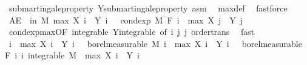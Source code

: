 \begin{isabellebody}
\ submartingale{\isacharunderscore}{\kern0pt}property\ Y{\isachardot}{\kern0pt}submartingale{\isacharunderscore}{\kern0pt}property\ asm\ \isamarkupfalse%
\ max{\isacharunderscore}{\kern0pt}def\ \isamarkupfalse%
\ fastforce\isanewline
\ \ \ \ \isamarkupfalse%
\ {\isachardoublequoteopen}AE\ {\isasymxi}\ in\ M{\isachardot}{\kern0pt}\ max\ {\isacharparenleft}{\kern0pt}X\ i\ {\isasymxi}{\isacharparenright}{\kern0pt}\ {\isacharparenleft}{\kern0pt}Y\ i\ {\isasymxi}{\isacharparenright}{\kern0pt}\ {\isasymle}\ cond{\isacharunderscore}{\kern0pt}exp\ M\ {\isacharparenleft}{\kern0pt}F\ i{\isacharparenright}{\kern0pt}\ {\isacharparenleft}{\kern0pt}{\isasymlambda}{\isasymxi}{\isachardot}{\kern0pt}\ max\ {\isacharparenleft}{\kern0pt}X\ j\ {\isasymxi}{\isacharparenright}{\kern0pt}\ {\isacharparenleft}{\kern0pt}Y\ j\ {\isasymxi}{\isacharparenright}{\kern0pt}{\isacharparenright}{\kern0pt}\ {\isasymxi}{\isachardoublequoteclose}\ \isamarkupfalse%
\ cond{\isacharunderscore}{\kern0pt}exp{\isacharunderscore}{\kern0pt}max{\isacharbrackleft}{\kern0pt}OF\ integrable\ Y{\isachardot}{\kern0pt}integrable{\isacharcomma}{\kern0pt}\ of\ i\ j\ j{\isacharbrackright}{\kern0pt}\ order{\isachardot}{\kern0pt}trans\ \isamarkupfalse%
\ fast\isanewline
\ \ \isacommand{{\isacharbraceright}{\kern0pt}}\isamarkupfalse%
\isanewline
\ \ \isamarkupfalse%
\ {\isachardoublequoteopen}{\isasymAnd}i{\isachardot}{\kern0pt}\ {\isacharparenleft}{\kern0pt}{\isasymlambda}{\isasymxi}{\isachardot}{\kern0pt}\ max\ {\isacharparenleft}{\kern0pt}X\ i\ {\isasymxi}{\isacharparenright}{\kern0pt}\ {\isacharparenleft}{\kern0pt}Y\ i\ {\isasymxi}{\isacharparenright}{\kern0pt}{\isacharparenright}{\kern0pt}\ {\isasymin}\ borel{\isacharunderscore}{\kern0pt}measurable\ M{\isachardoublequoteclose}\ {\isachardoublequoteopen}{\isasymAnd}i{\isachardot}{\kern0pt}\ {\isacharparenleft}{\kern0pt}{\isasymlambda}{\isasymxi}{\isachardot}{\kern0pt}\ max\ {\isacharparenleft}{\kern0pt}X\ i\ {\isasymxi}{\isacharparenright}{\kern0pt}\ {\isacharparenleft}{\kern0pt}Y\ i\ {\isasymxi}{\isacharparenright}{\kern0pt}{\isacharparenright}{\kern0pt}\ {\isasymin}\ borel{\isacharunderscore}{\kern0pt}measurable\ {\isacharparenleft}{\kern0pt}F\ i{\isacharparenright}{\kern0pt}{\isachardoublequoteclose}\ {\isachardoublequoteopen}{\isasymAnd}i{\isachardot}{\kern0pt}\ integrable\ M\ {\isacharparenleft}{\kern0pt}{\isasymlambda}{\isasymxi}{\isachardot}{\kern0pt}\ max\ {\isacharparenleft}{\kern0pt}X\ i\ {\isasymxi}{\isacharparenright}{\kern0pt}\ {\isacharparenleft}{\kern0pt}Y\ i\ {\isasymxi}{\isacharparenright}{\kern0pt}{\isacharparenright}{\kern0pt}{\isachardoublequoteclose}\ \isamarkupfalse%

\end{isabellebody}
